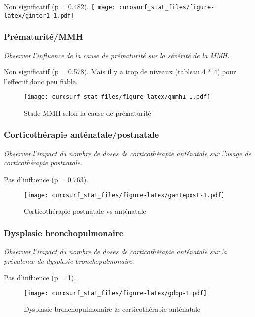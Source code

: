 \documentclass[
  10pt,
  a4paper,
]{scrartcl}
\begin{document}
Non significatif (p = 0.482).
\texttt{[image: curosurf\_stat\_files/figure-latex/ginter1-1.pdf]}

\hypertarget{pruxe9maturituxe9mmh}{%
\subsubsection{Prématurité/MMH}\label{pruxe9maturituxe9mmh}}

\emph{Observer l'influence de la cause de prématurité sur la sévérité de
la MMH.}

Non significatif (p = 0.578). Mais il y a trop de niveaux (tableau 4 *
4) pour l'effectif donc peu fiable.

\begin{figure}
\centering
\texttt{[image: curosurf\_stat\_files/figure-latex/gmmh1-1.pdf]}
\caption{Stade MMH selon la cause de prématurité}
\end{figure}

\hypertarget{corticothuxe9rapie-antuxe9natalepostnatale}{%
\subsubsection{Corticothérapie
anténatale/postnatale}\label{corticothuxe9rapie-antuxe9natalepostnatale}}

\emph{Observer l'impact du nombre de doses de corticothérapie anténatale
sur l'usage de corticothérapie postnatale.}

Pas d'influence (p = 0.763).

\begin{figure}
\centering
\texttt{[image: curosurf\_stat\_files/figure-latex/gantepost-1.pdf]}
\caption{Corticothérapie postnatale vs anténatale}
\end{figure}

\hypertarget{dysplasie-bronchopulmonaire}{%
\subsubsection{Dysplasie
bronchopulmonaire}\label{dysplasie-bronchopulmonaire}}

\emph{Observer l'impact du nombre de doses de corticothérapie anténatale
sur la prévalence de dysplasie bronchopulmonaire.}

Pas d'influence (p = 1).

\begin{figure}
\centering
\texttt{[image: curosurf\_stat\_files/figure-latex/gdbp-1.pdf]}
\caption{Dysplasie bronchopulmonaire \& corticothérapie anténatale}
\end{figure}
\end{document}
